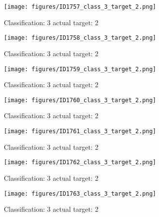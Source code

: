 \begin{figure}[h!]
\begin{center}
\texttt{[image: figures/ID1757\_class\_3\_target\_2.png]}
\end{center}
\caption{ Classification: 3 actual target: 2}
\label{fig:ID1757_class_3_target_2}
\end{figure}
\begin{figure}[h!]
\begin{center}
\texttt{[image: figures/ID1758\_class\_3\_target\_2.png]}
\end{center}
\caption{ Classification: 3 actual target: 2}
\label{fig:ID1758_class_3_target_2}
\end{figure}
\begin{figure}[h!]
\begin{center}
\texttt{[image: figures/ID1759\_class\_3\_target\_2.png]}
\end{center}
\caption{ Classification: 3 actual target: 2}
\label{fig:ID1759_class_3_target_2}
\end{figure}
\begin{figure}[h!]
\begin{center}
\texttt{[image: figures/ID1760\_class\_3\_target\_2.png]}
\end{center}
\caption{ Classification: 3 actual target: 2}
\label{fig:ID1760_class_3_target_2}
\end{figure}
\begin{figure}[h!]
\begin{center}
\texttt{[image: figures/ID1761\_class\_3\_target\_2.png]}
\end{center}
\caption{ Classification: 3 actual target: 2}
\label{fig:ID1761_class_3_target_2}
\end{figure}
\begin{figure}[h!]
\begin{center}
\texttt{[image: figures/ID1762\_class\_3\_target\_2.png]}
\end{center}
\caption{ Classification: 3 actual target: 2}
\label{fig:ID1762_class_3_target_2}
\end{figure}
\begin{figure}[h!]
\begin{center}
\texttt{[image: figures/ID1763\_class\_3\_target\_2.png]}
\end{center}
\caption{ Classification: 3 actual target: 2}
\label{fig:ID1763_class_3_target_2}
\end{figure}
